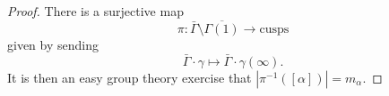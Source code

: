 \documentclass[a4paper]{article}
\begin{document}
\begin{proof}
  There is a surjective map
  \[
    \pi: \bar{\Gamma} \setminus \overline{\Gamma(1)} \to \text{cusps}
  \]
  given by sending
  \[
    \bar{\Gamma} \cdot \gamma \mapsto \bar{\Gamma}\cdot \gamma(\infty).
  \]
  It is then an easy group theory exercise that $|\pi^{-1}([\alpha])| = m_\alpha$.
%
%
\end{proof}
\end{document}
